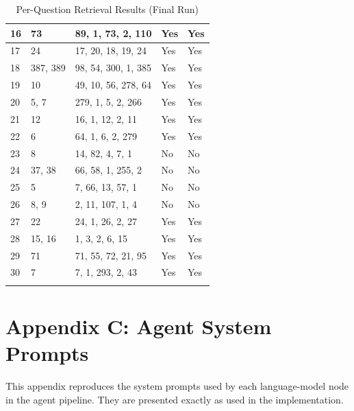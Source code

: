 \begin{longtable}{p{0.5cm} p{2cm} p{4.5cm} p{1.6cm} p{1.6cm}}
16 & 73       & 89, 1, 73, 2, 110     & Yes & Yes \\ \midrule
17 & 24       & 17, 20, 18, 19, 24    & Yes & Yes \\ \midrule
18 & 387, 389 & 98, 54, 300, 1, 385   & Yes & Yes \\ \midrule
19 & 10       & 49, 10, 56, 278, 64   & Yes & Yes \\ \midrule
20 & 5, 7     & 279, 1, 5, 2, 266     & Yes & Yes \\ \midrule
21 & 12       & 16, 1, 12, 2, 11      & Yes & Yes \\ \midrule
22 & 6        & 64, 1, 6, 2, 279      & Yes & Yes \\ \midrule
23 & 8        & 14, 82, 4, 7, 1       & No  & No  \\ \midrule
24 & 37, 38   & 66, 58, 1, 255, 2     & No  & No  \\ \midrule
25 & 5        & 7, 66, 13, 57, 1      & No  & No  \\ \midrule
26 & 8, 9     & 2, 11, 107, 1, 4      & No  & No  \\ \midrule
27 & 22       & 24, 1, 26, 2, 27      & Yes & Yes \\ \midrule
28 & 15, 16   & 1, 3, 2, 6, 15        & Yes & Yes \\ \midrule
29 & 71       & 71, 55, 72, 21, 95    & Yes & Yes \\ \midrule
30 & 7        & 7, 1, 293, 2, 43      & Yes & Yes \\
\bottomrule
\caption{Per-Question Retrieval Results (Final Run)}
\label{tab:appendix_results}
\end{longtable}

\section*{Appendix C: Agent System Prompts}

\hs This appendix reproduces the system prompts used by each language-model node in the
agent pipeline. They are presented exactly as used in the implementation.

